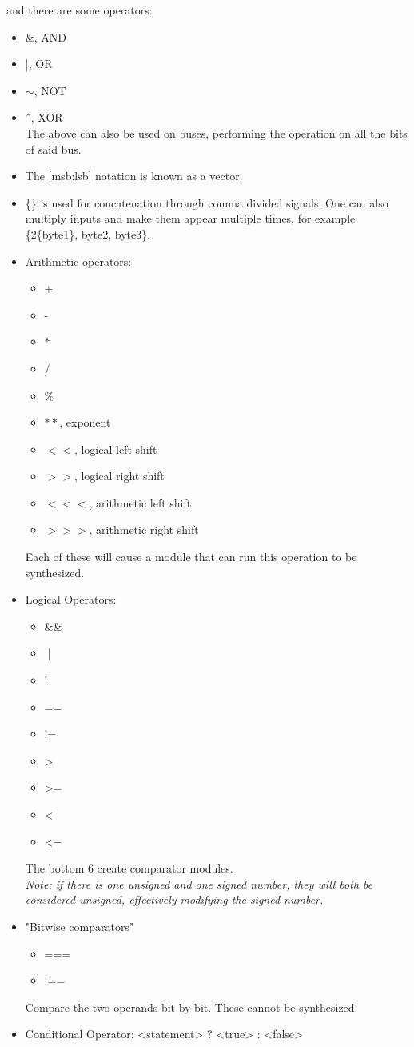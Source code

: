 \documentclass[nobib]{tufte-handout}
\begin{document}
and there are some operators:
\begin{itemize}
    \item \&, AND
    \item |, OR
    \item $\sim$, NOT
    \item ˆ, XOR\\
    The above can also be used on buses, performing the operation on all the bits of said bus.
    \item The [msb:lsb] notation is known as a vector.\\
    \item \{\} is used for concatenation through comma divided signals. One can also multiply inputs and make them appear multiple times, for example \{2\{byte1\}, byte2, byte3\}.
    \item Arithmetic operators:
    \begin{itemize}
        \item +
        \item -
        \item $*$
        \item /
        \item \%
        \item $**$, exponent
        \item $<<$, logical left shift
        \item $>>$, logical right shift
        \item $<<<$, arithmetic left shift
        \item $>>>$, arithmetic right shift
    \end{itemize}
    Each of these will cause a module that can run this operation to be synthesized. 
    \item Logical Operators:
    \begin{itemize}
        \item \&\&
        \item ||
        \item !
        \item ==
        \item !=
        \item >
        \item >=
        \item <
        \item <=
    \end{itemize}
    The bottom 6 create comparator modules.\\   
    \textit{Note: if there is one unsigned and one signed number, they will both be considered unsigned, effectively modifying the signed number.}
    \item "Bitwise comparators"
    \begin{itemize}
        \item ===
        \item !==
    \end{itemize}
    Compare the two operands bit by bit. These cannot be synthesized.
    \item Conditional Operator: <statement> ? <true> : <false>
\end{itemize}
\end{document}
